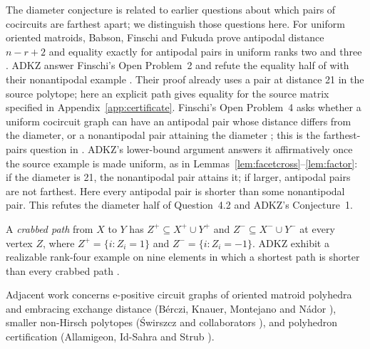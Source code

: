 \documentclass[11pt]{article}
\theoremstyle{remark}
\begin{document}
\begin{appendices}
The diameter conjecture is related to earlier questions about which pairs
of cocircuits are farthest apart; we distinguish those questions here.
For uniform oriented matroids, Babson, Finschi and Fukuda prove antipodal distance $n-r+2$
\cite[Lemma~2]{bff} and equality exactly for antipodal pairs in uniform
ranks two and three \cite[Lemma~6]{bff}. ADKZ answer Finschi's Open Problem~2
and refute the equality half of \cite[Question~4.2]{felsner}
with their nonantipodal example \cite[Proposition~8 and preceding paragraph]{adkz}.
Their proof already uses a pair at distance 21 in the source polytope;
here an explicit path gives equality for the source matrix specified in Appendix~\ref{app:certificate}.
Finschi's Open Problem~4 asks whether a uniform cocircuit graph can
have an antipodal pair whose distance differs from the diameter, or a
nonantipodal pair attaining the diameter \cite[p.~90]{finschi}; this is
the farthest-pairs question in \cite[final remarks, pp.~13--14]{bff}.
ADKZ's lower-bound argument answers it affirmatively once the source
example is made uniform, as in Lemmas~\ref{lem:facetcross}--\ref{lem:factor}:
if the diameter is 21, the nonantipodal pair attains it; if larger,
antipodal pairs are not farthest.
Here every antipodal pair is shorter than some nonantipodal pair.
This refutes the diameter half of Question~4.2 and ADKZ's Conjecture~1.

A \emph{crabbed path} from $X$ to $Y$ has
$Z^+\subseteq X^+\cup Y^+$ and $Z^-\subseteq X^-\cup Y^-$ at every
vertex $Z$, where $Z^+=\{i:Z_i=1\}$ and $Z^-=\{i:Z_i=-1\}$.
ADKZ exhibit a realizable rank-four example on nine elements in which a
shortest path is shorter than every crabbed path \cite[Theorem~9]{adkz}.

Adjacent work concerns e-positive circuit graphs of oriented matroid
polyhedra and embracing exchange distance
(B\'erczi, Knauer, Montejano and N\'ador \cite[Corollary~1.4 and Definition~2.1]{embracing}),
smaller non-Hirsch polytopes (\'Swirszcz and collaborators \cite[\S4.1]{hopper}),
and polyhedron certification (Allamigeon, Id-Sahra and Strub
\cite[abstract and \S1]{cert26}).

\end{appendices}
\end{document}
